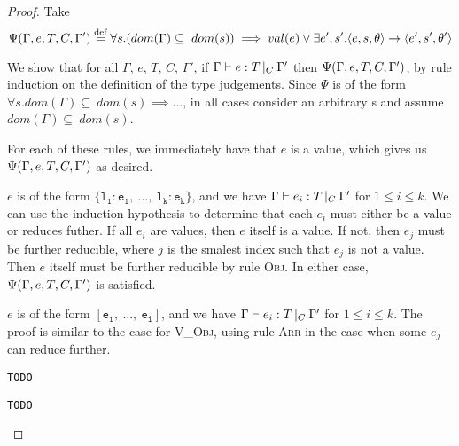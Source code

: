 \documentclass[a4paper]{article}
\theoremstyle{dotless}
\begin{document}
\begin{proof}\label{expProgressProof}
  Take $$ \Psi(\Gamma, e, T, C, \Gamma') \stackrel{\text{def}}{=} \\
  \forall s.  (dom(\Gamma) \subseteq\ dom(s)) \implies val(e) \vee
  \exists e', s'. \langle{}e,s,\theta\rangle{}\rightarrow{}\langle{}e',s',\theta'\rangle $$

  We show that for all $\Gamma$, $e$, $T$, $C$, $\Gamma'$, if
  $\Gamma{}\vdash e: T\,|_C\:\Gamma'$ then $\Psi(\Gamma, e, T, C, \Gamma')$, by rule induction on the definition of
  the type judgements. Since $\Psi$ is of the form $\forall s.dom(\Gamma) \subseteq\ dom(s)\implies\dots$, in all cases consider an arbitrary s
  and assume $dom(\Gamma) \subseteq\ dom(s)$.

  \begin{case}\label{values} 

	For each of these rules, we immediately have that $e$ is a value, which
	gives us $\Psi(\Gamma, e, T, C, \Gamma'){}$ as desired.

  \end{case}

  \begin{case}[V\_Obj]\label{v_obj}

	$e$ is of the form $\mathtt{\{l_1: e_1,\ \dots,\ l_k: e_k\}}$, and we have $\Gamma{}\vdash e_i: T\,|_C\:\Gamma'$ for $1 \leq i \leq k$.
	We can use the induction hypothesis to determine that each $e_i$ must
	either be a value or reduces futher. If all $e_i$ are values, then $e$
	itself is a value. If not, then $e_j$ must be further reducible, where
	$j$ is the smalest index such that $e_j$ is not a value. Then $e$
	itself must be further reducible by rule \textsc{Obj}. In either case,
	$\Psi(\Gamma, e, T, C, \Gamma')$ is satisfied.

  \end{case}

  \begin{case}[V\_Arr]\label{v_arr}

	$e$ is of the form $\mathtt{[e_1,\ \dots,\ e_i]}$, and we have $\Gamma{}\vdash e_i: T\,|_C\:\Gamma'$ for $1 \leq i \leq k$.
	The proof is similar to the case for \textsc{V\_Obj}, using rule
	\textsc{Arr} in the case when some $e_j$ can reduce further.

  \end{case}

  \begin{case}[Fun1]\label{fun1}
	\texttt{TODO}
  \end{case}

  \begin{case}[Fun2]\label{fun2}
	\texttt{TODO}
  \end{case}


\end{proof}
\end{document}
